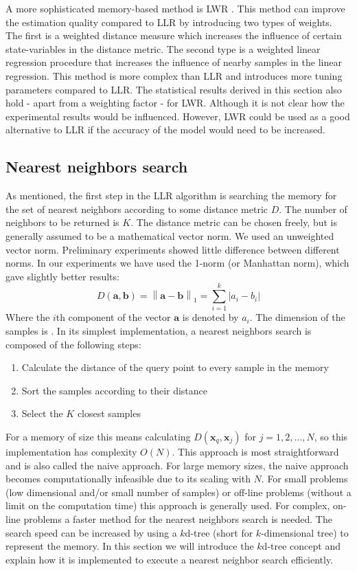 A more sophisticated memory-based method is \ac{LWR} \cite{SchaalAtkeson:94}. This method can improve the estimation quality compared to \ac{LLR} by introducing two types of weights. The first is a weighted distance measure which increases the influence of certain state-variables in the distance metric. The second type is a weighted linear regression procedure that increases the influence of nearby samples in the linear regression. This method is more complex than \ac{LLR} and introduces more tuning parameters compared to \ac{LLR}. The statistical results derived in this section also hold - apart from a weighting factor - for \ac{LWR}. Although it is not clear how the experimental results would be influenced. However, \ac{LWR} could be used as a good alternative to \ac{LLR} if the accuracy of the model would need to be increased.


\subsection{Nearest neighbors search}\label{sec:LLR-nearest neighbors search}
As mentioned, the first step in the \ac{LLR} algorithm is searching the memory for the set of nearest neighbors according to some distance metric $D$. The number of neighbors to be returned is $K$. The distance metric can be chosen freely, but is generally assumed to be a mathematical vector norm. We used an unweighted vector norm. Preliminary experiments showed little difference between different norms. In our experiments we have used the 1-norm (or Manhattan norm), which gave slightly better results:
$$
 D(\mathbf{a},\mathbf{b}) = \left\| \mathbf{a}-\mathbf{b} \right\|_1 = \sum_{i=1}^{k}{\left| a_i - b_i \right|}
$$
Where the $i$th component of the vector $\mathbf{a}$ is denoted by $a_i$. The dimension of the samples is . In its simplest implementation, a nearest neighbors search is composed of the following steps:
\begin{enumerate}
	\item Calculate the distance of the query point to every sample in the memory
	\item Sort the samples according to their distance
	\item Select the $K$ closest samples
\end{enumerate}
For a memory of size  this means calculating $D(\mathbf{x}_q,\mathbf{x}_j)$ for $j=1,2,\ldots,N$, so this implementation has complexity $O(N)$. This approach is most straightforward and is also called the naive approach. For large memory sizes, the naive approach becomes computationally infeasible due to its scaling with $N$. For small problems (low dimensional and/or small number of samples) or off-line problems (without a limit on the computation time) this approach is generally used. For complex, on-line problems a faster method for the nearest neighbors search is needed. The search speed can be increased by using a $k$d-tree (short for $k$-dimensional tree) to represent the memory. In this section we will introduce the $k$d-tree concept and explain how it is implemented to execute a nearest neighbor search efficiently.




